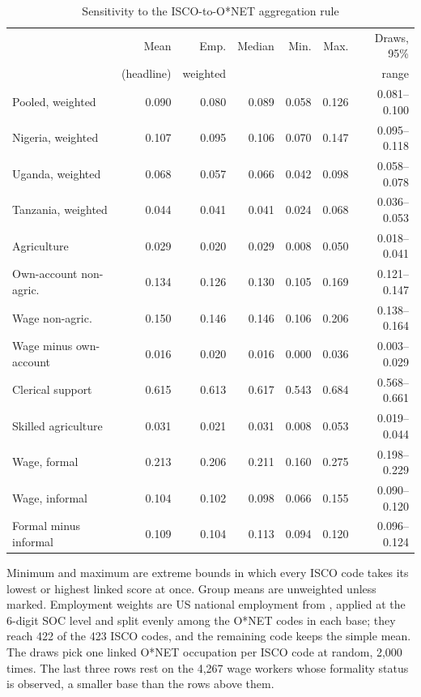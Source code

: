 \begin{table}[ht]
\centering
\caption{Sensitivity to the ISCO-to-O*NET aggregation rule}
\label{tab:crosswalk}
\footnotesize
\begin{tabular}{lrrrrrr}
\toprule
 & Mean & Emp. & Median & Min. & Max. & Draws, 95\% \\
 & (headline) & weighted &  &  &  & range \\
\midrule
Pooled, weighted        & 0.090 & 0.080 & 0.089 & 0.058 & 0.126 & 0.081--0.100 \\
Nigeria, weighted       & 0.107 & 0.095 & 0.106 & 0.070 & 0.147 & 0.095--0.118 \\
Uganda, weighted        & 0.068 & 0.057 & 0.066 & 0.042 & 0.098 & 0.058--0.078 \\
Tanzania, weighted      & 0.044 & 0.041 & 0.041 & 0.024 & 0.068 & 0.036--0.053 \\
Agriculture             & 0.029 & 0.020 & 0.029 & 0.008 & 0.050 & 0.018--0.041 \\
Own-account non-agric.  & 0.134 & 0.126 & 0.130 & 0.105 & 0.169 & 0.121--0.147 \\
Wage non-agric.         & 0.150 & 0.146 & 0.146 & 0.106 & 0.206 & 0.138--0.164 \\
Wage minus own-account  & 0.016 & 0.020 & 0.016 & 0.000 & 0.036 & 0.003--0.029 \\
Clerical support        & 0.615 & 0.613 & 0.617 & 0.543 & 0.684 & 0.568--0.661 \\
Skilled agriculture     & 0.031 & 0.021 & 0.031 & 0.008 & 0.053 & 0.019--0.044 \\
\midrule
Wage, formal            & 0.213 & 0.206 & 0.211 & 0.160 & 0.275 & 0.198--0.229 \\
Wage, informal          & 0.104 & 0.102 & 0.098 & 0.066 & 0.155 & 0.090--0.120 \\
Formal minus informal   & 0.109 & 0.104 & 0.113 & 0.094 & 0.120 & 0.096--0.124 \\
\bottomrule
\end{tabular}

\vspace{4pt}
\begin{minipage}{0.94\linewidth}
\footnotesize
Minimum and maximum are extreme bounds in which every ISCO code takes its lowest
or highest linked score at once. Group means are unweighted unless marked.
Employment weights are US national employment from \citet{oews2018}, applied at
the 6-digit SOC level and split evenly among the O*NET codes in each base; they
reach 422 of the 423 ISCO codes, and the remaining code keeps the simple mean.
The draws pick one linked O*NET occupation per ISCO code at random, 2,000 times.
The last three rows rest on the 4,267 wage workers whose formality status is
observed, a smaller base than the rows above them.
\end{minipage}
\end{table}

